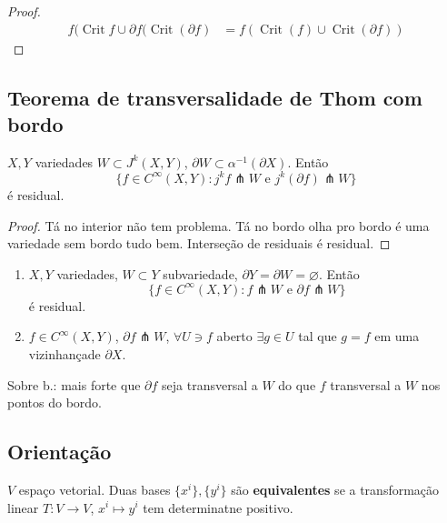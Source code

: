 \begin{proof}\leavevmode
 \begin{align*}
 f(\operatorname{ C ri t}f \cup \partial f(\operatorname{C r i t}(\partial f)&=f(\operatorname{C r it }(f) \cup  \operatorname{ C r i t}(\partial f))
 \end{align*}
\end{proof}

\subsection{Teorema de transversalidade de Thom com bordo}

\begin{thm}\leavevmode
\(X,Y\) variedades \(W \subset J^k(X,Y)\), \(\partial W \subset \alpha^{-1}(\partial X)\). Então
\[\{f \in C^\infty(X,Y): j^kf \pitchfork W\text{ e } j^k(\partial f) \pitchfork W\}\]
é residual.
\end{thm}

\begin{proof}\leavevmode
Tá no interior não tem problema. Tá no bordo olha pro bordo é uma variedade sem bordo tudo bem. Interseção de residuais é residual.
\end{proof}

\begin{coro}\leavevmode
\begin{enumerate}
\item \(X,Y\) variedades, \(W \subset Y\) subvariedade, \(\partial Y=\partial W=\varnothing\). Então
	\[\{f \in C^\infty(X,Y): f \pitchfork W \text{ e } \partial f \pitchfork W\}\]
	é residual.
\item \(f \in C^\infty(X,Y)\), \(\partial f \pitchfork W\), \(\forall U \ni f\) aberto \(\exists g \in U\) tal que \(g=f\) em uma vizinhançade \(\partial X\).
\end{enumerate}
\end{coro}

\begin{remark}\leavevmode
Sobre b.: mais forte que \(\partial f\) seja transversal a \(W\) do que \(f\) transversal a \(W\) nos pontos do bordo.
\end{remark}

\subsection{Orientação}

\begin{defn}\leavevmode
\(V\) espaço vetorial. Duas bases \(\{x^i\}, \{y^i\}\) são \textbf{equivalentes}  se a transformação linear \(T:V \to V\), \(x^i \mapsto  y^i\) tem determinatne positivo.
\end{defn}

